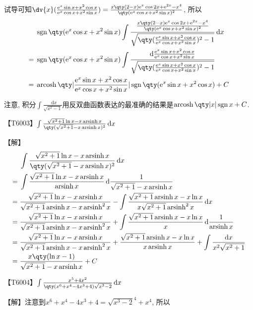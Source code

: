 \documentclass{ctexbook}
\DeclareMathOperator{\arsinh}{arsinh}
\DeclareMathOperator{\arcosh}{arcosh}
\DeclareMathOperator{\sgn}{sgn}
\newcommand{\e}{\mathrm{e}}
\newcommand*{\dif}{\mathop{}\!\mathrm{d}}
\begin{document}
{试导可知$\dv{x}(\frac{\e^{x}\sin{x}+x^{2}\cos{x}}{\e^{x}\cos{x}+x^{2}\sin{x}})=\frac{x\qty(2-x)\e^{x}\cos{2x}+\e^{2x}-x^{4}}{\qty(\e^{x}\cos{x}+x^{2}\sin{x})^{2}}$, 所以
\begin{align*}
{}&\sgn\qty(\e^{x}\cos{x}+x^{2}\sin{x})\int\frac{\frac{x\qty(2-x)\e^{x}\cos{2x}+\e^{2x}-x^{4}}{\qty(\e^{x}\cos{x}+x^{2}\sin{x})^{2}}}{\sqrt{\qty(\frac{\e^{x}\sin{x}+x^{2}\cos{x}}{\e^{x}\cos{x}+x^{2}\sin{x}})^{2}-1}}\dif{x}\\
={}&\sgn\qty(\e^{x}\cos{x}+x^{2}\sin{x})\int\frac{\dif{\frac{\e^{x}\sin{x}+x^{2}\cos{x}}{\e^{x}\cos{x}+x^{2}\sin{x}}}}{\sqrt{\qty(\frac{\e^{x}\sin{x}+x^{2}\cos{x}}{\e^{x}\cos{x}+x^{2}\sin{x}})^{2}-1}}\\
={}&\arcosh\qty|\frac{\e^{x}\sin{x}+x^{2}\cos{x}}{\e^{x}\cos{x}+x^{2}\sin{x}}|\sgn\qty(\e^{x}\sin{x}+x^{2}\cos{x})+C
\end{align*}\par
{\kaishu 注意, 积分$\int\frac{\dif{x}}{\sqrt{x^{2}-1}}$用反双曲函数表达的最准确的结果是$\arcosh\qty|x|\sgn{x}+C$. \par}
【T6003】$\int\frac{\sqrt{x^{2}+1}\ln{x}-x\arsinh{x}}{\qty(\sqrt{x^{2}+1}-x\arsinh{x})^{2}}\dif{x}$\par
【解】
\begin{align*}
{}&\int\frac{\sqrt{x^{2}+1}\ln{x}-x\arsinh{x}}{\qty(\sqrt{x^{2}+1}-x\arsinh{x})^{2}}\dif{x}\\
={}&\int\frac{\sqrt{x^{2}+1}\ln{x}-x\arsinh{x}}{\arsinh{x}}\dif{\frac{1}{\sqrt{x^{2}+1}-x\arsinh{x}}}\\
={}&\frac{\sqrt{x^{2}+1}\ln{x}-x\arsinh{x}}{\sqrt{x^{2}+1}\arsinh{x}-x\arsinh^{2}{x}}-\int\frac{\sqrt{x^{2}+1}\arsinh{x}-x\ln{x}}{x\sqrt{x^{2}+1}\arsinh^{2}{x}}\dif{x}\\
={}&\frac{\sqrt{x^{2}+1}\ln{x}-x\arsinh{x}}{\sqrt{x^{2}+1}\arsinh{x}-x\arsinh^{2}{x}}+\int\frac{\sqrt{x^{2}+1}\arsinh{x}-x\ln{x}}{x}\dif{\frac{1}{\arsinh{x}}}\\
={}&\frac{\sqrt{x^{2}+1}\ln{x}-x\arsinh{x}}{\sqrt{x^{2}+1}\arsinh{x}-x\arsinh^{2}{x}}+\frac{\sqrt{x^{2}+1}\arsinh{x}-x\ln{x}}{x\arsinh{x}}+\int\frac{\dif{x}}{x^{2}\sqrt{x^{2}+1}}\\
={}&\frac{x\qty(\ln{x}-1)}{\sqrt{x^{2}+1}-x\arsinh{x}}+C
\end{align*}\par
【T6004】$\int\frac{x^{5}+4x^{2}}{\qty(x^{6}+x^{4}-4x^{3}+4)\sqrt{x^{3}-2}}\dif{x}$\par
【解】注意到$x^{6}+x^{4}-4x^{3}+4=\sqrt{x^{3}-2}^{4}+x^{4}$, 所以
\begin{align*}

\end{align*}}
\end{document}
